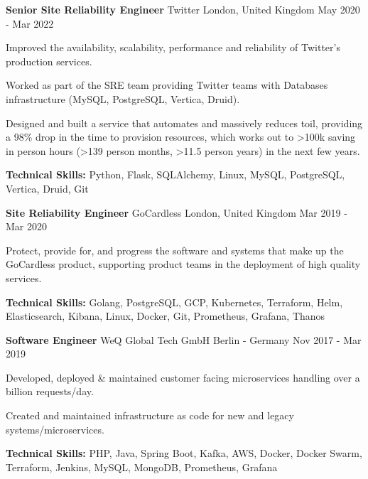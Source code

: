 \begin{cventries}
	\cventry
	{\textbf{Senior Site Reliability Engineer}} %
	{Twitter} %
	{London, United Kingdom} %
	{May 2020 - Mar 2022} %
	{
		\begin{cvitems} %
			\item {Improved the availability, scalability, performance and reliability of Twitter’s
			            production services.}
			\item {Worked as part of the SRE team providing Twitter teams with Databases
			            infrastructure (MySQL, PostgreSQL, Vertica, Druid).}
			\item {Designed and built a service that automates and massively reduces toil, providing a
			            98\% drop in the time to provision resources, which works out to >100k saving in person
			            hours (>139 person months, >11.5 person years) in the next few years.}
			\item {\textbf{Technical Skills:} Python, Flask, SQLAlchemy, Linux, MySQL, PostgreSQL,
			            Vertica, Druid, Git}
		\end{cvitems}
	}

	\cventry
	{\textbf{Site Reliability Engineer}} %
	{GoCardless} %
	{London, United Kingdom} %
	{Mar 2019 - Mar 2020} %
	{
		\begin{cvitems} %
			\item {Protect, provide for, and progress the software and systems that make up the
			            GoCardless product, supporting product teams in the deployment of high quality services.}
			\item {\textbf{Technical Skills:} Golang, PostgreSQL, GCP, Kubernetes, Terraform, Helm,
			            Elasticsearch, Kibana, Linux, Docker, Git, Prometheus, Grafana, Thanos}
		\end{cvitems}
	}

	\cventry
	{\textbf{Software Engineer}} %
	{WeQ Global Tech GmbH} %
	{Berlin - Germany} %
	{Nov 2017 - Mar 2019} %
	{
		\begin{cvitems} %
			\item {Developed, deployed \& maintained customer facing microservices handling over a
			            billion requests/day.}
			\item {Created and maintained infrastructure as code for new and legacy
			            systems/microservices.}
			\item {\textbf{Technical Skills:} PHP, Java, Spring Boot, Kafka, AWS, Docker, Docker Swarm,
			            Terraform, Jenkins, MySQL, MongoDB, Prometheus, Grafana}
		\end{cvitems}
	}


\end{cventries}
